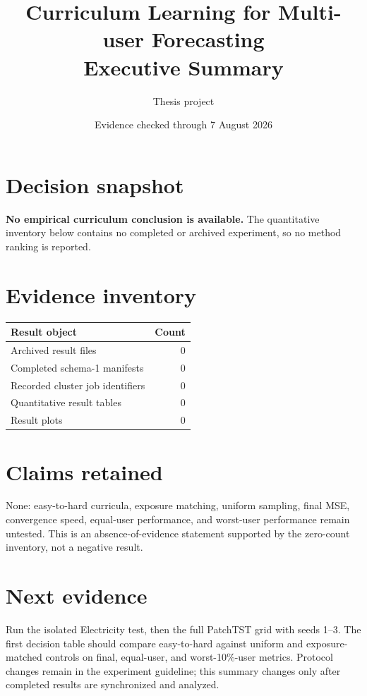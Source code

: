 \documentclass[10pt,a4paper]{article}
\title{\textbf{Curriculum Learning for Multi-user Forecasting}\\Executive Summary}
\author{Thesis project}
\date{Evidence checked through 7 August 2026}
\begin{document}
\maketitle

\section*{Decision snapshot}
\textcolor{amber}{\textbf{No empirical curriculum conclusion is available.}}
The quantitative inventory below contains no completed or archived experiment,
so no method ranking is reported.

\section{Evidence inventory}
\begin{center}
\small
\begin{tabularx}{\linewidth}{@{}Yr@{}}
\toprule
\textbf{Result object} & \textbf{Count} \\
\midrule
Archived result files & 0 \\
Completed schema-1 manifests & 0 \\
Recorded cluster job identifiers & 0 \\
Quantitative result tables & 0 \\
Result plots & 0 \\
\bottomrule
\end{tabularx}
\end{center}

\section{Claims retained}
None: easy-to-hard curricula, exposure matching, uniform sampling, final MSE,
convergence speed, equal-user performance, and worst-user performance remain
untested. This is an absence-of-evidence statement supported by the zero-count
inventory, not a negative result.

\section{Next evidence}
Run the isolated Electricity test, then the full PatchTST grid with seeds 1--3.
The first decision table should compare easy-to-hard against uniform and
exposure-matched controls on final, equal-user, and worst-10\%-user metrics.
Protocol changes remain in the experiment guideline; this summary changes only
after completed results are synchronized and analyzed.
\end{document}
